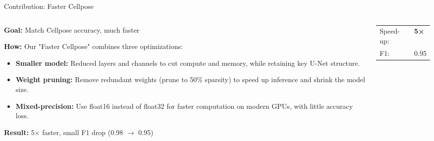 \documentclass[aspectratio=169]{beamer}
\begin{document}
\begin{frame}{Contribution: Faster Cellpose}
    \begin{columns}
        \begin{column}{0.55\textwidth}
            \textbf{Goal:} Match Cellpose accuracy, much faster
            
            \vspace{0.8em}
            \textbf{How:} Our "Faster Cellpose" combines three optimizations:
            \begin{itemize}
                \item \textbf{Smaller model:} Reduced layers and channels to cut compute and memory, while retaining key U-Net structure.
                \item \textbf{Weight pruning:} Remove redundant weights (prune to 50\% sparsity) to speed up inference and shrink the model size.
                \item \textbf{Mixed-precision:} Use float16 instead of float32 for faster computation on modern GPUs, with little accuracy loss.
            \end{itemize}
            
            \vspace{0.8em}
            \textbf{Result:} 5× faster, small F1 drop (0.98 $\rightarrow$ 0.95)
        \end{column}
        \begin{column}{0.45\textwidth}
            \begin{center}
            \end{center}
            
            \vspace{0.5em}
            \begin{tabular}{ll}
                Speed-up: & \textbf{5×} \\
                F1: & 0.95 \\
            \end{tabular}
        \end{column}
    \end{columns}
\end{frame}
\end{document}
